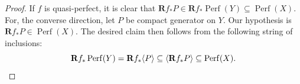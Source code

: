\documentclass[10pt,a4paper]{amsart}
\begin{document}
\begin{proof}
    If $f$ is quasi-perfect, it is clear that $\mathbf{R}f_\ast P\in \mathbf{R}f_\ast \operatorname{Perf}(Y)\subseteq \operatorname{Perf}(X)$.
    For, the converse direction, let $P$ be compact generator on $Y$. Our hypothesis is $\mathbf{R}f_\ast P\in \operatorname{Perf}(X)$. 
    The desired claim then follows from the following string of inclusions:
    \begin{displaymath}
        \mathbf{R}f_\ast \operatorname{Perf}(Y) = \mathbf{R}f_\ast \langle P \rangle \subseteq \langle \mathbf{R}f_\ast P \rangle \subseteq \operatorname{Perf}(X).\qedhere
    \end{displaymath}
\end{proof}
\end{document}
